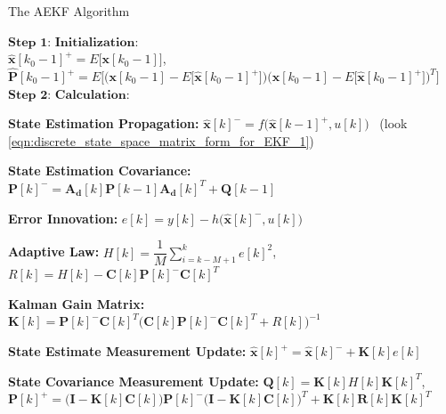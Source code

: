 \documentclass[12pt]{article}
\let\oldnl\nl%
\newcommand{\nonl}{\renewcommand{\nl}{\let\nl\oldnl}}%
\begin{document}
\begin{algorithm}
	\caption{The AEKF Algorithm \label{Alg:The_AEKF_Algorithm}}
	\DontPrintSemicolon	
	\nonl$\textbf{Step 1: Initialization:}$\\
	\nonl$\bm{\hat{x}}[k_{0}-1]^{+} = E\big[\bm{x}[k_{0}-1]\big]$,~$\bm{\hat{P}}[k_{0}-1]^{+}=E\bigg[\bigg(\bm{x}[k_{0}-1]-E\big[\bm{\hat{x}}[k_{0}-1]^{+}\big]\bigg)\bigg(\bm{x}[k_{0}-1]-E\big[\bm{\hat{x}}[k_{0}-1]^{+}\big]\bigg)^{T}\bigg]$\\
	\nonl$\textbf{Step 2: Calculation:}$\\
	\nonl{} 
	{
		\textbf{State Estimation Propagation:} $\bm{\hat{x}}[k]^{-} = f\bigg(\bm{\hat{x}}[k-1]^{+},u[k]\bigg)$ ~(look \ref{eqn:discrete_state_space_matrix_form_for_EKF_1})\\
		\vspace{3mm}
		
		\textbf{State Estimation Covariance:} $\bm{P}[k]^{-} = \bm{A_{d}}[k]\bm{P}[k-1]\bm{A_{d}}[k]^{T} + \bm{Q}[k-1]$ \\
		\vspace{3mm}
		
		\textbf{Error Innovation:} $e[k] = y[k]-h\bigg(\bm{\hat{x}}[k]^{-},u[k]\bigg)$ \\
		\vspace{3mm}
		
		\textbf{Adaptive Law:} $H[k] = \dfrac{1}{M}\sum_{i=k-M+1}^{k}e[k]^2$,~$R[k]=H[k]-\bm{C}[k]\bm{P}[k]^{-}\bm{C}[k]^{T}$ \\
		\vspace{3mm}
		
		\textbf{Kalman Gain Matrix:} $\bm{K}[k] = \bm{P}[k]^{-}\bm{C}[k]^{T}\bigg(\bm{C}[k]\bm{P}[k]^{-}\bm{C}[k]^{T}+R[k]\bigg)^{-1}$ 
		\vspace{3mm}
		
		\textbf{State Estimate Measurement Update:} $\bm{\hat{x}}[k]^{+} = \bm{\hat{x}}[k]^{-} + \bm{K}[k]e[k]$  \\
		\vspace{3mm}
		
		\textbf{State Covariance Measurement Update:} $\bm{Q}[k] = \bm{K}[k]H[k]\bm{K}[k]^{T}$, ~$\bm{P}[k]^{+} = \bigg(\bm{I}-\bm{K}[k]\bm{C}[k]\bigg)\bm{P}[k]^{-}\bigg(\bm{I}-\bm{K}[k]\bm{C}[k]\bigg)^{T} + \bm{K}[k]\bm{R}[k]\bm{K}[k]^{T}$ \\
		 \vspace{3mm}
		 
	}

\end{algorithm}
\end{document}
